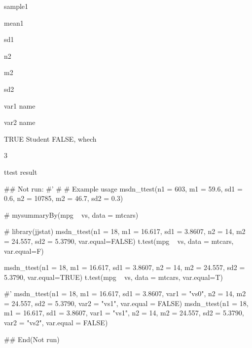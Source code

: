 \documentclass[a4paper]{book}
\begin{document}
\begin{Arguments}
\begin{ldescription}
\item[\code{n1}] sample1

\item[\code{m1}] mean1

\item[\code{sd1}] sd1

\item[\code{n2}] n2

\item[\code{m2}] m2

\item[\code{sd2}] sd2

\item[\code{var1}] var1 name

\item[\code{var2}] var2 name

\item[\code{var.equal}] TRUE Student FALSE, whech

\item[\code{digits}] 3
\end{ldescription}
\end{Arguments}
%
\begin{Value}
ttest result
\end{Value}
%
\begin{Examples}
\begin{ExampleCode}

## Not run: 
#'
# # Example usage
msdn_ttest(n1 = 603, m1 = 59.6, sd1 = 0.6,
           n2 = 10785, m2 = 46.7, sd2 = 0.3)

#  mysummaryBy(mpg ~ vs, data = mtcars)

# library(jjstat)
msdn_ttest(n1 = 18, m1 = 16.617, sd1 = 3.8607,
           n2 = 14, m2 = 24.557, sd2 = 5.3790,  var.equal=FALSE)
t.test(mpg ~ vs, data = mtcars, var.equal=F)%

msdn_ttest(n1 = 18, m1 = 16.617, sd1 = 3.8607,
           n2 = 14, m2 = 24.557, sd2 = 5.3790, var.equal=TRUE)
t.test(mpg ~ vs, data = mtcars, var.equal=T)%

#'
msdn_ttest(n1 = 18, m1 = 16.617, sd1 = 3.8607, var1 = "vs0",
           n2 = 14, m2 = 24.557, sd2 = 5.3790, var2 = "vs1", var.equal = FALSE)
msdn_ttest(n1 = 18, m1 = 16.617, sd1 = 3.8607, var1 = "vs1",
           n2 = 14, m2 = 24.557, sd2 = 5.3790, var2 = "vs2", var.equal = FALSE)



## End(Not run)

\end{ExampleCode}
\end{Examples}
\end{document}
